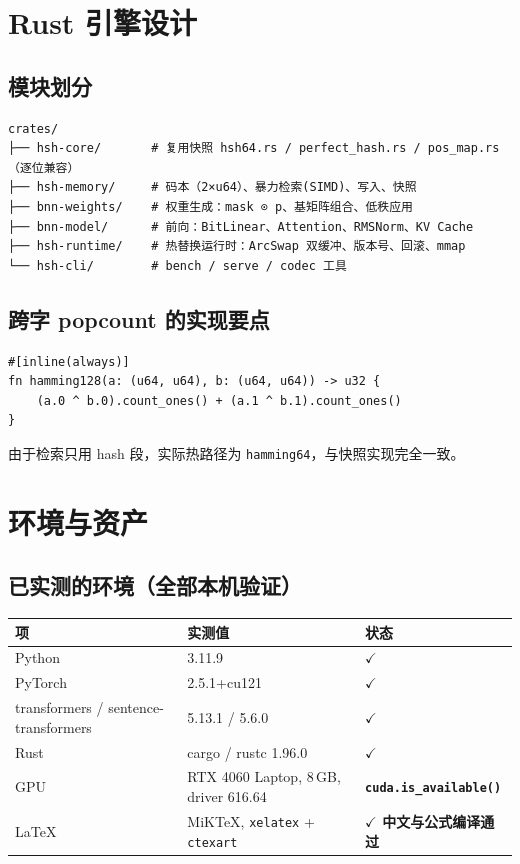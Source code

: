 \documentclass[11pt,a4paper]{ctexart}
\newcommand{\ok}[1]{\textcolor{okgreen}{\textbf{#1}}}
\theoremstyle{definition}
\begin{document}
\section{Rust 引擎设计}

\subsection{模块划分}

\begin{lstlisting}
crates/
├── hsh-core/       # 复用快照 hsh64.rs / perfect_hash.rs / pos_map.rs（逐位兼容）
├── hsh-memory/     # 码本（2×u64）、暴力检索(SIMD)、写入、快照
├── bnn-weights/    # 权重生成：mask ⊙ p、基矩阵组合、低秩应用
├── bnn-model/      # 前向：BitLinear、Attention、RMSNorm、KV Cache
├── hsh-runtime/    # 热替换运行时：ArcSwap 双缓冲、版本号、回滚、mmap
└── hsh-cli/        # bench / serve / codec 工具
\end{lstlisting}

\subsection{跨字 popcount 的实现要点}

\begin{lstlisting}[language=RustLang]
#[inline(always)]
fn hamming128(a: (u64, u64), b: (u64, u64)) -> u32 {
    (a.0 ^ b.0).count_ones() + (a.1 ^ b.1).count_ones()
}
\end{lstlisting}

由于检索只用 hash 段，实际热路径为 \texttt{hamming64}，与快照实现完全一致。

\section{环境与资产}\label{sec:env}

\subsection{已实测的环境（全部本机验证）}

\begin{center}
\begin{tabularx}{\textwidth}{@{}llX@{}}
\toprule
\textbf{项} & \textbf{实测值} & \textbf{状态} \\
\midrule
Python & 3.11.9 & \ok{$\checkmark$} \\
PyTorch & 2.5.1+cu121 & \ok{$\checkmark$} \\
transformers / sentence-transformers & 5.13.1 / 5.6.0 & \ok{$\checkmark$} \\
Rust & cargo / rustc 1.96.0 & \ok{$\checkmark$} \\
GPU & RTX 4060 Laptop, 8\,GB, driver 616.64 & \ok{\texttt{cuda.is\_available()}} \\
LaTeX & MiKTeX, \texttt{xelatex} + \texttt{ctexart} & \ok{$\checkmark$ 中文与公式编译通过} \\
\bottomrule
\end{tabularx}
\end{center}
\end{document}
